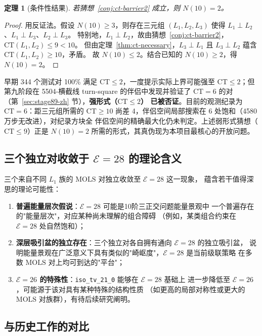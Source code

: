 \documentclass[11pt,a4paper]{ctexart}
\newtheorem{theorem}{定理}[section]
\theoremstyle{remark}
\newcommand{\CT}{\mathrm{CT}}
\newcommand{\E}{\mathcal{E}}
\newcommand{\MOLS}{\mathrm{MOLS}}
\begin{document}
\begin{theorem}[条件性结果]
  若猜想~\ref{conj:ct-barrier2} 成立，则 $N(10) = 2$。
\end{theorem}

\begin{proof}
  用反证法。假设 $N(10) \ge 3$，则存在三元组 $(L_1, L_2, L_3)$ 使得
  $L_1 \perp L_2$、$L_1 \perp L_3$、$L_2 \perp L_3$。
  特别地，$L_1 \perp L_2$，故由猜想~\ref{conj:ct-barrier2}，
  $\CT(L_1, L_2) \le 9 < 10$。
  但由定理~\ref{thm:ct-necessary}，$L_3 \perp L_1$ 且 $L_3 \perp L_2$
  蕴含 $\CT(L_1, L_2) \ge 10$，矛盾。
  故 $N(10) \le 2$。结合已知的 $N(10) \ge 2$，得 $N(10) = 2$。
\end{proof}

早期 344 个测试对 100\% 满足 $\CT \le 2$，一度提示实际上界可能强至
$\CT \le 2$；但第九阶段在 5504-横截线 turn-square 的伴侣中发现并验证了
$\CT = 6$ 的对（第~\ref{sec:stage89-zh} 节），\textbf{强形式（$\CT\le2$）
已被否证}。目前的观测纪录为 $\CT = 6$：距三元组所需的 $\CT \ge 10$
尚差 4，伴侣空间局部搜索在 6 处饱和（4580 万步无改进），对纪录方块全
伴侣空间的精确最大化仍未判定。上述弱形式猜想（$\CT \le 9$）正是
$N(10)=2$ 所需的形式，其真伪现为本项目最核心的开放问题。

\subsection{三个独立对收敛于 $\E = 28$ 的理论含义}

三个来自不同 $L_1$ 族的 $\MOLS$ 对独立收敛至 $\E = 28$ 这一现象，
蕴含若干值得深思的理论可能性：

\begin{enumerate}[leftmargin=2.5em,label=（\arabic*）]
  \item \textbf{普遍能量层次假说}：$\E = 28$ 可能是10阶三正交问题能量景观中
    一个普遍存在的"能量层次"，对应某种尚未理解的组合障碍
    （例如，某类组合约束在 $\E = 28$ 处自然饱和）；
  \item \textbf{深层吸引盆的独立存在}：三个独立对各自拥有通向 $\E = 28$ 的独立吸引盆，
    说明能量景观在广泛意义下具有类似的"崎岖度"，$\E = 28$ 是当前级联策略
    在多数 $\MOLS$ 对上均可到达的"平台"；
  \item \textbf{$\E = 26$ 的特殊性}：\texttt{iso\_tv\_21\_0} 能够在 $\E = 28$ 基础上
    进一步降低至 $\E = 26$，可能源于该对具有某种特殊的结构性质
    （如更高的局部对称性或更大的 $\MOLS$ 对族群），有待后续研究阐明。
\end{enumerate}

\subsection{与历史工作的对比}
\end{document}
